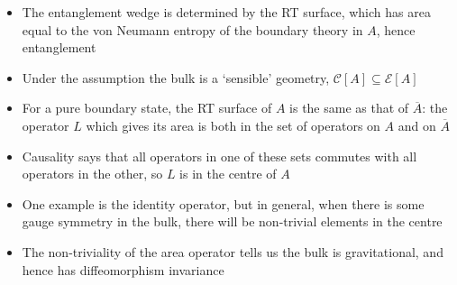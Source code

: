 \documentclass[12pt,a4paper]{article}
\numberwithin{equation}{section}
\begin{document}
\begin{itemize}
		\item The entanglement wedge is determined by the RT surface, which has area equal to the von Neumann entropy of the boundary theory in $A$, hence entanglement
		\item Under the assumption the bulk is a `sensible' geometry, $\mathcal{C}[A]\subseteq\mathcal{E}[A]$
		\item For a pure boundary state, the RT surface of $A$ is the same as that of $\overline{A}$: the operator $L$ which gives its area is both in the set of operators on $A$ and on $\overline{A}$
		\item Causality says that all operators in one of these sets commutes with all operators in the other, so $L$ is in the centre of $A$
		\item One example is the identity operator, but in general, when there is some gauge symmetry in the bulk, there will be non-trivial elements in the centre
		\item The non-triviality of the area operator tells us the bulk is gravitational, and hence has diffeomorphism invariance
	\end{itemize}
\end{document}
